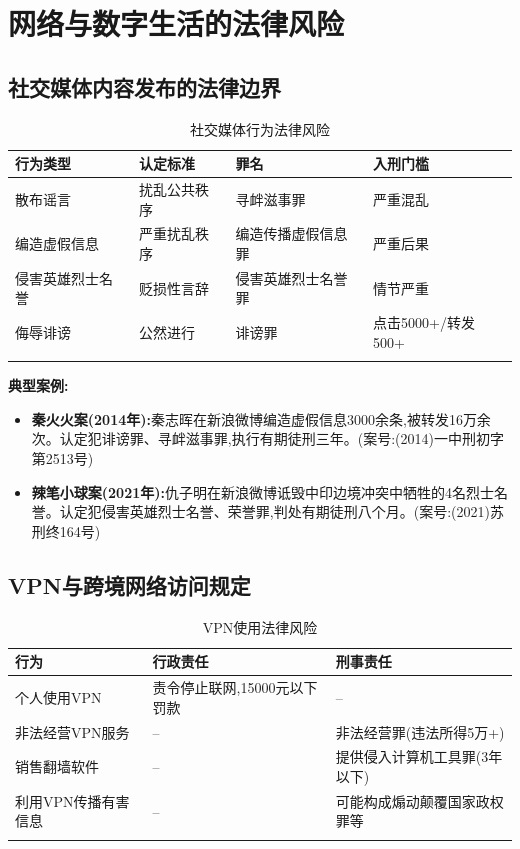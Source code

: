 \documentclass[12pt,a4paper]{article}
\begin{document}
\clearpage

\section{网络与数字生活的法律风险}

\subsection{社交媒体内容发布的法律边界}

\begin{longtable}{p{3cm}p{4cm}p{3cm}p{3cm}}
  \toprule
  \textbf{行为类型} & \textbf{认定标准} & \textbf{罪名} & \textbf{入刑门槛} \\
  \midrule
  散布谣言 & 扰乱公共秩序 & 寻衅滋事罪 & 严重混乱 \\
  编造虚假信息 & 严重扰乱秩序 & 编造传播虚假信息罪 & 严重后果 \\
  侵害英雄烈士名誉 & 贬损性言辞 & 侵害英雄烈士名誉罪 & 情节严重 \\
  侮辱诽谤 & 公然进行 & 诽谤罪 & 点击5000+/转发500+ \\
  \bottomrule
  \caption{社交媒体行为法律风险}
\end{longtable}

\textbf{典型案例:}
\begin{itemize}
  \item \textbf{秦火火案(2014年):}秦志晖在新浪微博编造虚假信息3000余条,被转发16万余次。认定犯诽谤罪、寻衅滋事罪,执行有期徒刑三年。(案号:(2014)一中刑初字第2513号)
  \item \textbf{辣笔小球案(2021年):}仇子明在新浪微博诋毁中印边境冲突中牺牲的4名烈士名誉。认定犯侵害英雄烈士名誉、荣誉罪,判处有期徒刑八个月。(案号:(2021)苏刑终164号)
\end{itemize}

\subsection{VPN与跨境网络访问规定}

\begin{longtable}{p{3cm}p{5cm}p{5cm}}
  \toprule
  \textbf{行为} & \textbf{行政责任} & \textbf{刑事责任} \\
  \midrule
  个人使用VPN & 责令停止联网,15000元以下罚款 & -- \\
  非法经营VPN服务 & -- & 非法经营罪(违法所得5万+) \\
  销售翻墙软件 & -- & 提供侵入计算机工具罪(3年以下) \\
  利用VPN传播有害信息 & -- & 可能构成煽动颠覆国家政权罪等 \\
  \bottomrule
  \caption{VPN使用法律风险}
\end{longtable}
\end{document}
